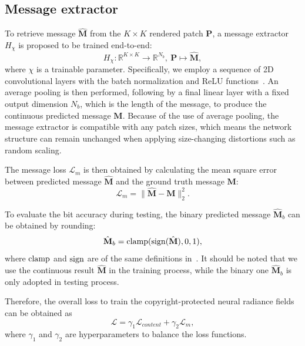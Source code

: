 \documentclass[10pt,twocolumn,letterpaper]{article}
\def\M{{\mathbf{M}}}
\begin{document}
\subsection{Message extractor}
To retrieve message $\hat{\M}$ from the $K \times K$ rendered patch $\mathbf{P}$, a message extractor $H_{\chi}$ is proposed to be trained end-to-end:
\begin{equation}
H_{\chi}: \mathbb{R}^{K \times K}\rightarrow \mathbb{R}^{N_b},\ \mathbf{P} \mapsto \hat{\M},
\end{equation}
where $\chi$ is a trainable parameter. 
Specifically, we employ a sequence of 2D convolutional layers with the batch normalization and ReLU functions~\cite{ioffe2015batch}. An average pooling is then performed, following by a ﬁnal linear layer with a fixed output dimension $N_b$, which is the length of the message, to produce the continuous predicted message $\hat{\M}$. Because of the use of average pooling, the message extractor is compatible with any patch sizes, which means the network structure can remain unchanged when applying size-changing distortions such as random scaling.

The message loss $\mathcal{L}_m$ is then obtained by calculating the mean square error between predicted message $\hat{\mathbf{M}}$ and the ground truth message $\mathbf{M}$:
\begin{equation}
  \mathcal{L}_m = \|\hat{\mathbf{M}}-\mathbf{M}\|_2^2.
\end{equation}

To evaluate the bit accuracy during testing, the binary predicted message $\hat{\mathbf{M}}_b$ can be obtained by rounding:
\begin{equation}
\hat{\mathbf{M}}_b =  {\rm clamp}({\rm sign}(\hat{\mathbf{M}}), 0, 1),
\end{equation}
where $\rm clamp$ and $\rm sign$ are of the same definitions in~\cite{Yoo_2022_CVPR}. It should be noted that we use the continuous result $\hat{\mathbf{M}}$ in the training process, while the binary one $\hat{\mathbf{M}}_b$ is only adopted in testing process.

Therefore, the overall loss to train the copyright-protected neural radiance fields can be obtained as
\begin{equation}
\mathcal{L} = \gamma_1\mathcal{L}_{content} + \gamma_2\mathcal{L}_m,
\label{eq:loss}
\end{equation}
where $\gamma_1$ and $\gamma_2$ are hyperparameters to balance the loss functions.
\end{document}
